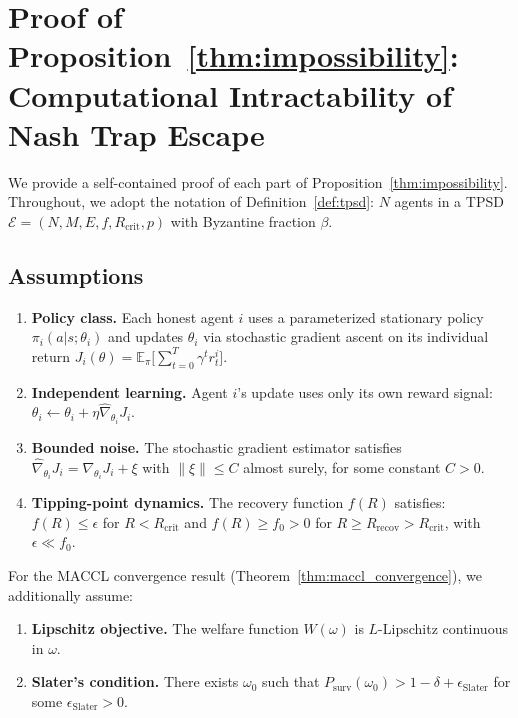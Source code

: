 
\section{Proof of Proposition~\ref{thm:impossibility}: Computational
Intractability of Nash Trap Escape}
\label{app:impossibility_proof}

We provide a self-contained proof of each part of
Proposition~\ref{thm:impossibility}. Throughout, we adopt the notation
of Definition~\ref{def:tpsd}: $N$ agents in a TPSD
$\mathcal{E} = (N, M, E, f, R_{\mathrm{crit}}, p)$ with
Byzantine fraction $\beta$.

\subsection{Assumptions}
\label{asm:assumptions}

\begin{enumerate}
  \item[\textbf{(A1)}] \textbf{Policy class.}
    Each honest agent $i$ uses a parameterized stationary policy
    $\pi_i(a | s; \theta_i)$ and updates $\theta_i$ via
    stochastic gradient ascent on its individual return
    $J_i(\theta) = \mathbb{E}_\pi \bigl[\sum_{t=0}^T \gamma^t r_t^i\bigr]$.
  \item[\textbf{(A2)}] \textbf{Independent learning.}
    Agent $i$'s update uses only its own reward signal:
    $\theta_i \leftarrow \theta_i + \eta \hat\nabla_{\theta_i} J_i$.
  \item[\textbf{(A3)}] \textbf{Bounded noise.}
    The stochastic gradient estimator satisfies
    $\hat\nabla_{\theta_i} J_i = \nabla_{\theta_i} J_i + \xi$
    with $\|\xi\| \leq C$ almost surely, for some constant $C > 0$.
  \item[\textbf{(A4)}] \textbf{Tipping-point dynamics.}
    The recovery function $f(R)$ satisfies:
    $f(R) \leq \epsilon$ for $R < R_{\mathrm{crit}}$
    and $f(R) \geq f_0 > 0$ for $R \geq R_{\mathrm{recov}} > R_{\mathrm{crit}}$,
    with $\epsilon \ll f_0$.
\end{enumerate}

For the MACCL convergence result (Theorem~\ref{thm:maccl_convergence}),
we additionally assume:
\begin{enumerate}
  \item[\textbf{(A5)}] \label{asm:lipschitz_appendix}
    \textbf{Lipschitz objective.}
    The welfare function $W(\omega)$ is $L$-Lipschitz continuous
    in $\omega$.
  \item[\textbf{(A6)}] \label{asm:slater_appendix}
    \textbf{Slater's condition.}
    There exists $\omega_0$ such that
    $P_{\mathrm{surv}}(\omega_0) > 1 - \delta + \epsilon_{\mathrm{Slater}}$
    for some $\epsilon_{\mathrm{Slater}} > 0$.
\end{enumerate}


